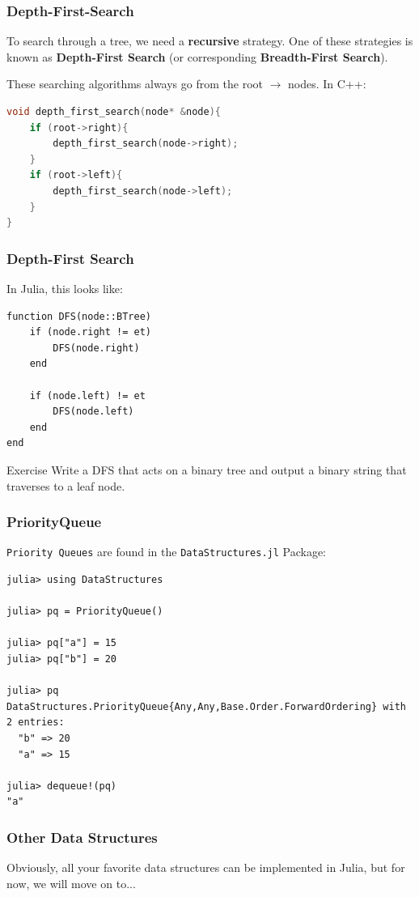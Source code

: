 \documentclass{beamer}
\begin{document}
\begin{frame}[fragile]
\frametitle{Depth-First-Search}
To search through a tree, we need a \textbf{recursive} strategy. One of these strategies is known as \textbf{Depth-First Search} (or corresponding \textbf{Breadth-First Search}). 

\vspace{0.5cm}
These searching algorithms always go from the root $\rightarrow$ nodes. In C++:
\begin{lstlisting}[language=c++]
void depth_first_search(node* &node){
    if (root->right){
        depth_first_search(node->right);
    }
    if (root->left){
        depth_first_search(node->left);
    }
}
\end{lstlisting}
\end{frame}

\begin{frame}[fragile]
\frametitle{Depth-First Search}
In Julia, this looks like:
\begin{lstlisting}
function DFS(node::BTree)
    if (node.right != et)
        DFS(node.right)
    end
    
    if (node.left) != et
        DFS(node.left)
    end
end

\end{lstlisting}
\begin{block}{Exercise}
Write a DFS that acts on a binary tree and output a binary string that traverses to a leaf node.
\end{block}
\end{frame}

\begin{frame}[fragile]
\frametitle{PriorityQueue}
\texttt{Priority Queues} are found in the \texttt{DataStructures.jl} Package:
\begin{lstlisting}
julia> using DataStructures

julia> pq = PriorityQueue()

julia> pq["a"] = 15
julia> pq["b"] = 20

julia> pq
DataStructures.PriorityQueue{Any,Any,Base.Order.ForwardOrdering} with 2 entries:
  "b" => 20
  "a" => 15

julia> dequeue!(pq)
"a"
\end{lstlisting}
\end{frame}

\begin{frame}
\frametitle{Other Data Structures}
Obviously, all your favorite data structures can be implemented in Julia, but for now, we will move on to...
\end{frame}
\end{document}
